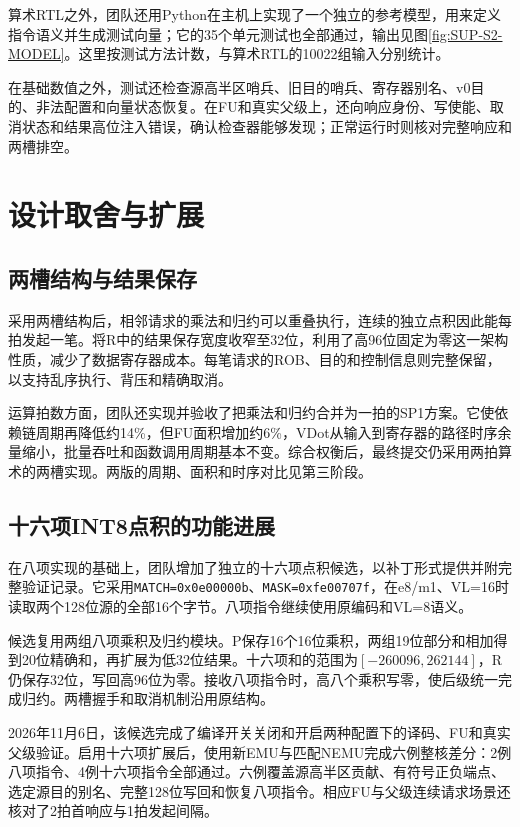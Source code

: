 算术RTL之外，团队还用Python在主机上实现了一个独立的参考模型，用来定义指令语义并生成测试向量；它的35个单元测试也全部通过，输出见图\ref{fig:SUP-S2-MODEL}。这里按测试方法计数，与算术RTL的10022组输入分别统计。


在基础数值之外，测试还检查源高半区哨兵、旧目的哨兵、寄存器别名、v0目的、非法配置和向量状态恢复。在FU和真实父级上，还向响应身份、写使能、取消状态和结果高位注入错误，确认检查器能够发现；正常运行时则核对完整响应和两槽排空。

\section{设计取舍与扩展}
\subsection{两槽结构与结果保存}\label{subsec:2-tradeoff}
采用两槽结构后，相邻请求的乘法和归约可以重叠执行，连续的独立点积因此能每拍发起一笔。将R中的结果保存宽度收窄至32位，利用了高96位固定为零这一架构性质，减少了数据寄存器成本。每笔请求的ROB、目的和控制信息则完整保留，以支持乱序执行、背压和精确取消。

运算拍数方面，团队还实现并验收了把乘法和归约合并为一拍的SP1方案。它使依赖链周期再降低约14\%，但FU面积增加约6\%，VDot从输入到寄存器的路径时序余量缩小，批量吞吐和函数调用周期基本不变。综合权衡后，最终提交仍采用两拍算术的两槽实现。两版的周期、面积和时序对比见第三阶段。

\subsection{十六项INT8点积的功能进展}\label{sec:2-dot16}
在八项实现的基础上，团队增加了独立的十六项点积候选，以补丁形式提供并附完整验证记录。它采用\texttt{MATCH=0x0e00000b}、\texttt{MASK=0xfe00707f}，在e8/m1、VL=16时读取两个128位源的全部16个字节。八项指令继续使用原编码和VL=8语义。

候选复用两组八项乘积及归约模块。P保存16个16位乘积，两组19位部分和相加得到20位精确和，再扩展为低32位结果。十六项和的范围为$[-260096,262144]$，R仍保存32位，写回高96位为零。接收八项指令时，高八个乘积写零，使后级统一完成归约。两槽握手和取消机制沿用原结构。

2026年11月6日，该候选完成了编译开关关闭和开启两种配置下的译码、FU和真实父级验证。启用十六项扩展后，使用新EMU与匹配NEMU完成六例整核差分：2例八项指令、4例十六项指令全部通过。六例覆盖源高半区贡献、有符号正负端点、选定源目的别名、完整128位写回和恢复八项指令。相应FU与父级连续请求场景还核对了2拍首响应与1拍发起间隔。

